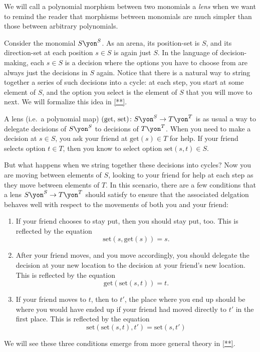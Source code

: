 \documentclass[Book-Poly]{subfiles}
\begin{document}
We will call a polynomial morphism between two monomials a \emph{lens} when we want to remind the reader that morphisms between monomials are much simpler than those between arbitrary polynomials.

\begin{remark}
Consider the monomial $S\yon^S$. As an arena, its position-set is $S$, and its direction-set at each position $s\in S$ is again just $S$.
In the language of decision-making, each $s \in S$ is a decision where the options you have to choose from are always just the decisions in $S$ again.
Notice that there is a natural way to string together a series of such decisions into a cycle: at each step, you start at some element of $S$, and the option you select is the element of $S$ that you will move to next.
We will formalize this idea in \cref{**}.

A lens (i.e.\ a polynomial map) $(\text{get, set})\colon S\yon^S\to T\yon^T$ is as usual a way to delegate decisions of $S\yon^S$ to decisions of $T\yon^T$.
When you need to make a decision at $s \in S$, you ask your friend at $\text{get}(s) \in T$ for help.
If your friend selects option $t \in T$, then you know to select option $\text{set}(s, t) \in S$.

But what happens when we string together these decisions into cycles?
Now you are moving between elements of $S$, looking to your friend for help at each step as they move between elements of $T$.
In this scenario, there are a few conditions that a lens $S\yon^S \to T\yon^T$ should satisfy to ensure that the associated delgation behaves well with respect to the movements of both you and your friend:
\begin{enumerate}
    \item If your friend chooses to stay put, then you should stay put, too.
    This is reflected by the equation
    \[
        \text{set}(s,\text{get}(s))=s.
    \]
    
    \item After your friend moves, and you move accordingly, you should delegate the decision at your new location to the decision at your friend's new location.
    This is reflected by the equation
    \[
        \text{get}(\text{set}(s,t))=t.
    \]

    \item If your friend moves to $t$, then to $t'$, the place where you end up should be where you would have ended up if your friend had moved directly to $t'$ in the first place.
    This is reflected by the equation
    \[
        \text{set}(\text{set}(s,t),t')=\text{set}(s,t')
    \]
\end{enumerate}
We will see these three conditions emerge from more general theory in \cref{**}.
\end{remark}
\end{document}
